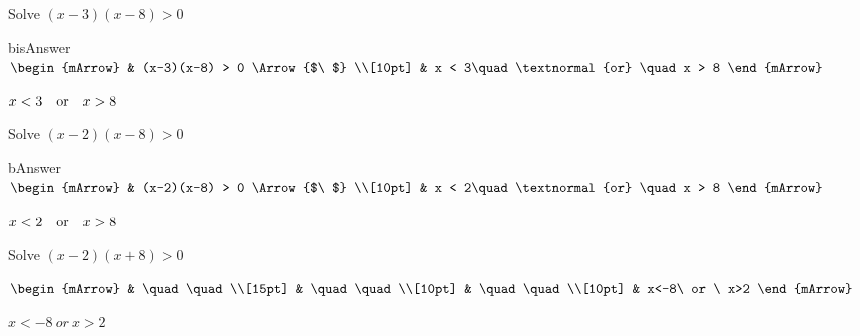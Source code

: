 \clearpage
\begin{mtask}[resume]
   \task Solve $(x-3)(x-8) > 0$
              \begin{envOut}[equal height group=A-Rev-2]{bisAnswer}
			       $\begin{mArrow}
			             & (x-3)(x-8) > 0      \Arrow{$\ $} \\[10pt]
                         & x < 3\quad \textnormal{or} \quad x > 8	   
	                \end{mArrow}$
              \end{envOut}			  
			  \begin{exercise}\begin{shortsolution}  
				       $ x < 3\quad \textnormal{or} \quad x > 8$
			  \end{shortsolution}\end{exercise}
			  
   \task  Solve $(x-2)(x-8) > 0$
              \begin{envOut}[equal height group=A-Rev-1]{bAnswer}
			       $\begin{mArrow}
			             & (x-2)(x-8) > 0      \Arrow{$\ $} \\[10pt]
                         & x < 2\quad \textnormal{or} \quad x > 8	   
	                \end{mArrow}$
              \end{envOut}			  
			  \begin{exercise}\begin{shortsolution}  
				       $ x < 2\quad \textnormal{or} \quad x > 8$
			  \end{shortsolution}\end{exercise}
			  
   \task \begin{exercise} Solve $(x-2)(x+8) > 0$
           \begin{envSolution}
             $\begin{mArrow} 
			       & \quad \quad              \\[15pt]
                   & \quad \quad              \\[10pt]
		   		   & \quad \quad              \\[10pt]
				   & x<-8\ or \ x>2 
              \end{mArrow}$
            \begin{shortsolution}  
			     $x<-8\ or \ x>2$
			\end{shortsolution}				 
           \end{envSolution}
         \end{exercise}
\end{mtask}
		 
